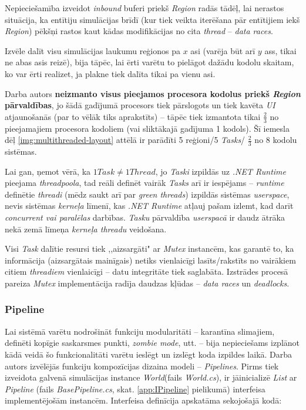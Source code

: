 Nepieciešamība izveidot \emph{inbound} buferi priekš \emph{Region} radās tādēļ, lai
nerastos situācija,
ka entītiju simulācijas brīdī (kur tiek veikta iterēšana pār entītijiem iekš \emph{Region}) pēkšņi
rastos kaut kādas modifikācijas no cita \emph{thread} -- \emph{data races}.

Izvēle dalīt visu simulācijas laukumu reģionos pa \(x\) asi (varēja būt arī \(y\)
ass, tikai ne abas asis reizē), bija tāpēc, lai ērti varētu to pielāgot dažādu
kodolu skaitam, ko var ērti realizet, ja plakne tiek dalīta tikai pa vienu asi.

Darba autors \textbf{neizmanto visus pieejamos procesora kodolus priekš \emph{Region} pārvaldības}, jo šādā gadījumā
procesors tiek pārslogots un tiek kavēta \emph{UI} atjaunošanās (par to
vēlāk tiks aprakstīts) -- tāpēc tiek izmantota tikai \(\frac{2}{3}\) no
pieejamajiem procesora kodoliem (vai sliktākajā gadījuma 1 kodols). Šī iemesla dēļ
\ref{img:multithreaded-layout} attēlā ir parādīti 5 reģioni/5 \emph{Tasks}/ \(\frac{2}{3}\) no 8 kodolu sistēmas.

Lai gan, ņemot vērā, ka \(1 Task\neq 1 Thread\), jo \emph{Taski} izpildās uz \emph{.NET Runtime}
pieejama \emph{threadpoola}\cite{csharp:tasks-not-threads}, tad reāli definēt vairāk
\emph{Tasks} arī ir iespējams -- \emph{runtime} definētie \emph{threadi} (mēdz saukt arī par
\emph{green threads}\cite{progr:green-threads}) izpildās
sistēmas \emph{userspace}\cite{sys:userspace}, nevis sistēmas \emph{kerneļa} līmenī, kas \emph{.NET Runtime}
atļauj pašam izlemt, kad darīt \emph{concurrent vai paralēlas}\cite{csharp:concurrent-parallel} darbības.
\emph{Tasku} pārvaldība
\emph{userspacā} ir daudz ātrāka nekā zemā līmeņa \emph{kerneļa threadu} veidošana.

Visi \emph{Task} dalītie resursi tiek ,,aizsargāti" ar \emph{Mutex}\cite{csharp:mutex}
instancēm, kas garantē to, ka informācija (aizsargātais mainīgais) netiks vienlaicīgi lasīts/rakstīts no
vairākiem citiem \emph{threadiem} vienlaicīgi -- datu integritāte tiek saglabāta. Izstrādes procesā
pareiza \emph{Mutex} implementācija radīja daudzas kļūdas -- \emph{data races} un \emph{deadlocks}.

\subsubsection*{Pipeline}

Lai sistēmā varētu nodrošināt funkciju modularitāti -- karantīna slimajiem,
definēti kopīgie saskarsmes punkti, \emph{zombie mode}, utt. -- bija nepieciešams
izplānot kādā veidā šo funkcionalitāti varētu ieslēgt un izslēgt koda izpildes
laikā. Darba autors izvēlējās funkciju kompozīcijas dizaina modeli --
\emph{Pipelines}\cite{progr:pipelines}. Pirms tiek izveidota galvenā simulācijas
instance \emph{World}(fails \emph{World.cs}), ir jāinicializē \emph{List} ar
\emph{Pipeline} (fails \emph{BasePipeline.cs}, skat. \ref{app:IPipeline} pielikumā)
interfeisa implementējošām instancēm. Interfeisa definīcija apskatāma sekojošajā kodā:

